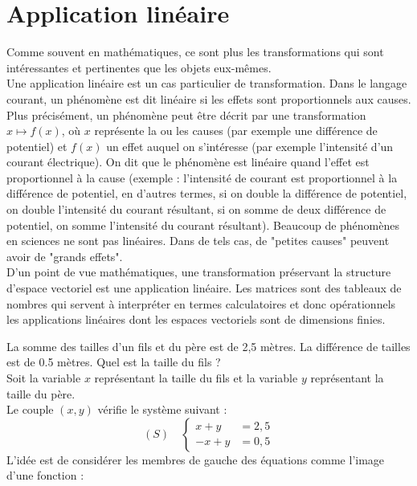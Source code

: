 \documentclass{book}
\begin{document}
\chapter*{Application linéaire}


\begin{Texte}
Comme souvent en mathématiques, ce sont plus les transformations qui sont intéressantes et pertinentes que les objets eux-mêmes.\\
Une application linéaire est un cas particulier de transformation.  Dans le langage courant, un phénomène est dit linéaire si les
effets sont proportionnels aux causes. \\
Plus précisément, un phénomène peut être décrit par une transformation$x \mapsto f (x)$, où $x$ représente la ou les causes (par exemple une différence de
potentiel) et $f(x)$ un effet auquel on s'intéresse (par exemple l'intensité
d'un courant électrique). On dit que le phénomène est linéaire quand  l'effet est proportionnel à la cause (exemple : l'intensité de courant est
proportionnel à la différence de potentiel, en d'autres termes, si on double
la différence de potentiel, on double l'intensité du courant résultant, si on somme de deux différence de potentiel, on somme l'intensité du courant résultant).
Beaucoup de phénomènes en sciences ne sont pas linéaires. Dans de tels
cas, de "petites causes" peuvent avoir de "grands effets".\\
D'un point de vue mathématiques, une
transformation préservant la structure d'espace vectoriel est une application linéaire.  Les matrices sont des tableaux de nombres qui servent à interpréter en termes calculatoires et donc opérationnels les applications linéaires dont les espaces vectoriels sont de dimensions finies.\\ 
\begin{Exemple}
La somme des tailles d'un fils et du père est de 2,5 mètres. La différence de tailles  est de 0.5 mètres.
Quel est la taille du fils ? \\
Soit la variable $x$ représentant la taille du fils et la variable $y$ représentant la taille du père.\\
Le couple $(x,y)$ vérifie le système suivant  :
$$(S)\quad \begin{cases}
x+y&=2,5\\
-x+y&=0,5
\end{cases}
$$
L'idée est de considérer les membres de gauche des équations comme l'image d'une fonction :
\begin{center}

\end{center}
\end{Exemple}
\end{Texte}
\end{document}
